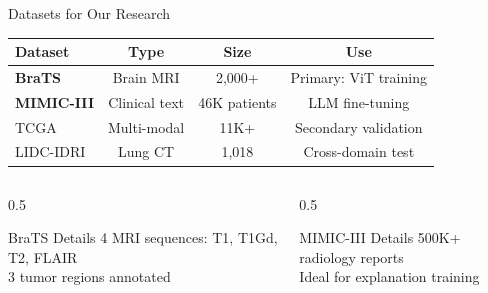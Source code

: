 \documentclass[aspectratio=169]{beamer}
\begin{document}
\begin{frame}{Datasets for Our Research}
    \begin{center}
        \begin{tabular}{@{}lccc@{}}
            \toprule
            \textbf{Dataset} & \textbf{Type} & \textbf{Size} & \textbf{Use} \\
            \midrule
            \textbf{BraTS} & Brain MRI & 2,000+ & Primary: ViT training \\
            \textbf{MIMIC-III} & Clinical text & 46K patients & LLM fine-tuning \\
            TCGA & Multi-modal & 11K+ & Secondary validation \\
            LIDC-IDRI & Lung CT & 1,018 & Cross-domain test \\
            \bottomrule
        \end{tabular}
    \end{center}
    
    \vspace{1em}
    
    \begin{columns}
        \begin{column}{0.5\textwidth}
            \begin{block}{BraTS Details}
                4 MRI sequences: T1, T1Gd, T2, FLAIR \\
                3 tumor regions annotated
            \end{block}
        \end{column}
        \begin{column}{0.5\textwidth}
            \begin{block}{MIMIC-III Details}
                500K+ radiology reports \\
                Ideal for explanation training
            \end{block}
        \end{column}
    \end{columns}
\end{frame}
\end{document}
